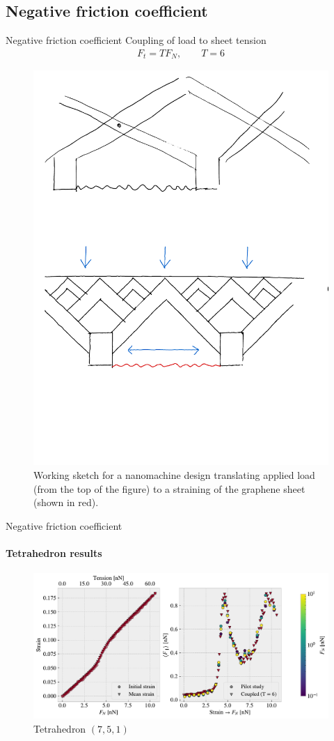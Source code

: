 \documentclass[
	10pt, %
]{beamer}
\begin{document}
\subsection{Negative friction coefficient}
\begin{frame}{Negative friction coefficient}
	Coupling of load to sheet tension 
	\begin{align*}
		F_t = TF_N, \qquad T = 6
	\end{align*}
	\begin{figure}[H]
		\centering
		\includegraphics[width=0.6\linewidth]{../thesis/figures/negative_coefficient/nanomachine.pdf}
		\caption{Working sketch for a nanomachine design translating applied load (from the top of the figure) to a straining of the graphene sheet (shown in red).}
		\label{fig:nanomachine}
	\end{figure}	  
\end{frame}
%
%
\begin{frame}{Negative friction coefficient}
	\framesubtitle{Tetrahedron results}
	
	\begin{figure}[H]
		\centering
		\includegraphics[width=\linewidth]{../thesis/figures/negative_coefficient/manual_coupling_tension_pop7_5_1.pdf}	
		\caption{Tetrahedron $(7,5,1)$}
	\end{figure}	
\end{frame}
%
%
\end{document}
